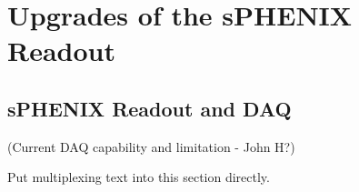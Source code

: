 \chapter{Upgrades of the sPHENIX Readout}
\label{chap:readout}

\section{sPHENIX Readout and DAQ}
\label{sec:streaming_readout}

(Current DAQ capability and limitation - John H?)



Put multiplexing text into this section directly.